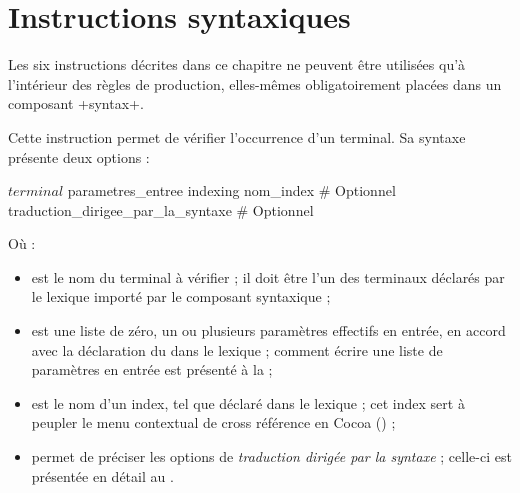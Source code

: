 
\chapter{Instructions syntaxiques}

Les six instructions décrites dans ce chapitre ne peuvent être utilisées qu'à l'intérieur des règles de production, elles-mêmes obligatoirement placées dans un composant \ggs+syntax+.




Cette instruction permet de vérifier l'occurrence d'un terminal. Sa syntaxe présente deux options :
\begin{galgascode}
$terminal$ parametres_entree
indexing nom_index # Optionnel
traduction_dirigee_par_la_syntaxe # Optionnel
\end{galgascode}

Où :
\begin{itemize}
  \item {} est le nom du terminal à vérifier ; il doit être l'un des terminaux déclarés par le lexique importé par le composant syntaxique ;
  \item {} est une liste de zéro, un ou plusieurs paramètres effectifs en entrée, en accord avec la déclaration du  dans le lexique ; comment écrire une liste de paramètres en entrée est présenté à la  ;
  \item {} est le nom d'un index, tel que déclaré dans le lexique ; cet index sert à peupler le menu contextual de cross référence en Cocoa () ;
  \item {} permet de préciser les options de \emph{traduction dirigée par la syntaxe} ; celle-ci est présentée en détail au . 
\end{itemize}






